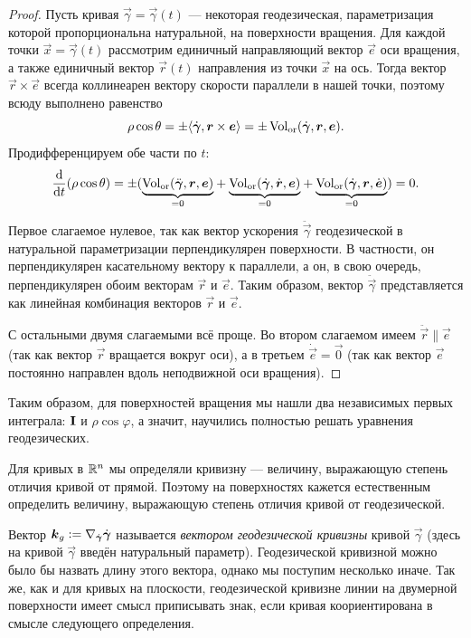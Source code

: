 \begin{proof}
	Пусть кривая $\vec{\gamma} = \vec{\gamma}(t)$ --- некоторая геодезическая, параметризация которой пропорциональна натуральной, на поверхности вращения. Для каждой точки $\vec{x} = \vec{\gamma}(t)$ рассмотрим единичный направляющий вектор $\vec{e}$ оси вращения, а также единичный вектор $\vec{r}(t)$ направления из точки $\vec{x}$ на ось. Тогда вектор $\vec{r} \times \vec{e}$ всегда коллинеарен вектору скорости параллели в нашей точки, поэтому всюду выполнено равенство
	\[
		\rho\cos\theta = \pm\langle\dot{\vec{\gamma}}, \vec{r} \times \vec{e}\rangle = \pm\Vol_{\Or}(\dot{\vec{\gamma}}, \vec{r}, \vec{e}).
	\]
	Продифференцируем обе части по $t$:
	\[
		\frac{\d}{\d t}(\rho\cos\theta) = \pm({\underbrace{\Vol_{\Or}(\ddot{\vec{\gamma}}, \vec{r}, \vec{e})}_{= 0}} + {\underbrace{\Vol_{\Or}(\dot{\vec{\gamma}}, \dot{\vec{r}}, \vec{e})}_{= 0}} + {\underbrace{\Vol_{\Or}(\dot{\vec{\gamma}}, \vec{r}, \dot{\vec{e}})}_{= 0}}) = 0.
	\]

	Первое слагаемое нулевое, так как вектор ускорения $\ddot{\vec{\gamma}}$ геодезической в натуральной параметризации перпендикулярен поверхности. В частности, он перпендикулярен касательному вектору к параллели, а он, в свою очередь, перпендикулярен обоим векторам $\vec{r}$ и $\vec{e}$. Таким образом, вектор $\ddot{\vec{\gamma}}$ представляется как линейная комбинация векторов $\vec{r}$ и $\vec{e}$.

	С остальными двумя слагаемыми всё проще. Во втором слагаемом имеем $\ddot{\vec{r}} \parallel \vec{e}$ (так как вектор $\vec{r}$ вращается вокруг оси), а в третьем $\dot{\vec{e}} = \vec{0}$ (так как вектор $\vec{e}$ постоянно направлен вдоль неподвижной оси вращения).
\end{proof}

Таким образом, для поверхностей вращения мы нашли два независимых первых интеграла: $\I$ и $\rho\cos\varphi$, а значит, научились полностью решать уравнения геодезических.

Для кривых в $\R^n$ мы определяли кривизну --- величину, выражающую степень отличия кривой от прямой. Поэтому на поверхностях кажется естественным определить величину, выражающую степень отличия кривой от геодезической.

Вектор $\vec{k}_g \vcentcolon = \nabla_{\dot{\vec{\gamma}}}\dot{\vec{\gamma}}$ называется \textit{вектором геодезической кривизны} кривой $\vec{\gamma}$ (здесь на кривой $\vec{\gamma}$ введён натуральный параметр). Геодезической кривизной можно было бы назвать длину этого вектора, однако мы поступим несколько иначе. Так же, как и для кривых на плоскости, геодезической кривизне линии на двумерной поверхности имеет смысл приписывать знак, если кривая коориентирована в смысле следующего определения.

